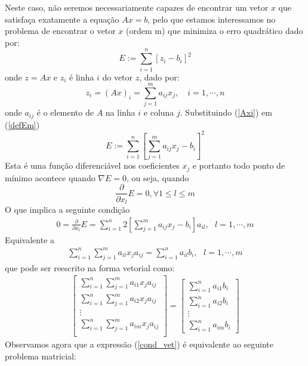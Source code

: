 Neste caso, não seremos necessariamente capazes de encontrar um vetor $x$ que satisfaça exatamente a equação $Ax=b$, pelo que estamos interessamos no problema de encontrar o vetor $x$ (ordem m) que minimiza o erro quadrático dado por:
\begin{equation}\label{defEm}
E:=\sum_{i=1}^n \left[z_i- b_i\right]^2
\end{equation}
onde $z=Ax$ e $z_i$ é linha $i$ do vetor $z$, dado por:
\begin{equation}\label{Axi}
z_i=(Ax)_i=\sum_{j=1}^m a_{ij} x_j,\quad i=1,\cdots,n
\end{equation}
onde $a_{ij}$ é o elemento de $A$ na linha $i$ e coluna $j$.
Substituindo (\ref{Axi}) em (\ref{defEm})
\begin{equation}\label{erro}
E:=\sum_{i=1}^n \left[\sum_{j=1}^m a_{ij} x_j- b_i\right]^2
\end{equation}
Esta é uma função diferenciável nos coeficientes $x_j$ e portanto todo ponto de mínimo acontece quando $\nabla E=0$, ou seja, quando $$\frac{\partial}{\partial x_l}E=0,\forall 1\leq l \leq m $$
O que implica a seguinte condição
\begin{eqnarray*}
0=\frac{\partial}{\partial x_l}E=\sum_{i=1}^n 2\left[\sum_{j=1}^m a_{ij} x_j- b_i\right] a_{il}, ~~~l=1,\cdots, m
\end{eqnarray*}
Equivalente a
\begin{eqnarray*}
\sum_{i=1}^n\sum_{j=1}^m  a_{il}x_j a_{ij}=\sum_{i=1}^na_{il}b_i,~~~l=1,\cdots, m
\end{eqnarray*}
que pode ser reescrito na forma vetorial como:
\begin{eqnarray}\label{cond_vet}
\left[
\begin{array}{c}
\sum_{i=1}^n\sum_{j=1}^m   a_{i1}x_ja_{ij}\\
\sum_{i=1}^n\sum_{j=1}^m   a_{i2}x_ja_{ij}\\
\vdots\\
\sum_{i=1}^n\sum_{j=1}^m   a_{im}x_ja_{ij}\\
\end{array}
\right]
=
\left[
\begin{array}{c}
\sum_{i=1}^na_{i1}b_i\\
\sum_{i=1}^na_{i2}b_i\\
\vdots\\
\sum_{i=1}^na_{im}b_i
\end{array}
\right]
\end{eqnarray}
Observamos agora que a expressão (\ref{cond_vet}) é equivalente ao seguinte problema matricial:

